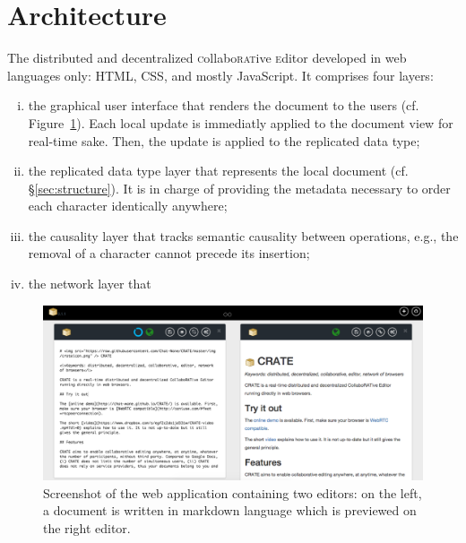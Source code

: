 
\section{Architecture}
\label{sec:architecture}

The distributed and decentralized \textsc{c}ollabo\textsc{rat}ive
\textsc{e}ditor \CRATE developed in web languages only: HTML, CSS, and mostly
JavaScript. It comprises four layers:
\begin{enumerate}[(i)]
\item the graphical user interface that renders the document to the users
  (cf. Figure~\ref{img:screenshot}). Each local update is immediatly applied to
  the document view for real-time sake. Then, the update is applied to the
  replicated data type;
\item the replicated data type layer that represents the local document
  (cf. §\ref{sec:structure}). It is in charge of providing the metadata
  necessary to order each character identically anywhere;
\item the causality layer that tracks semantic causality between operations,
  e.g., the removal of a character cannot precede its insertion;
\item the network layer that
\end{enumerate}

\begin{figure}
  \includegraphics[width=\textwidth]{./img/screenshot.png}
  \caption{\label{img:screenshot} Screenshot of the web application containing
    two editors: on the left, a document is written in markdown language which
    is previewed on the right editor.}
\end{figure}


